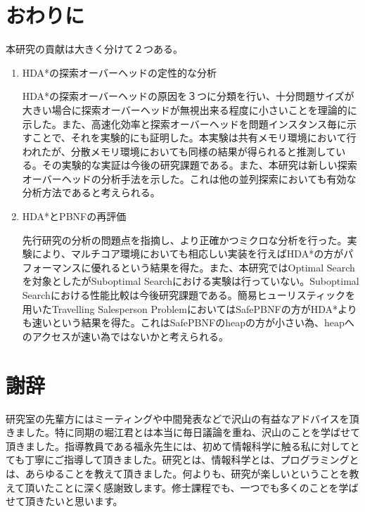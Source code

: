 \documentclass[uplatex]{jsarticle}
\begin{document}
\section{おわりに}
\label{sec:conclusion}

本研究の貢献は大きく分けて２つある。

\begin{enumerate}
\item HDA*の探索オーバーヘッドの定性的な分析

HDA*の探索オーバーヘッドの原因を３つに分類を行い、十分問題サイズが大きい場合に探索オーバーヘッドが無視出来る程度に小さいことを理論的に示した。また、高速化効率と探索オーバーヘッドを問題インスタンス毎に示すことで、それを実験的にも証明した。本実験は共有メモリ環境において行われたが、分散メモリ環境においても同様の結果が得られると推測している。その実験的な実証は今後の研究課題である。また、本研究は新しい探索オーバーヘッドの分析手法を示した。これは他の並列探索においても有効な分析方法であると考えられる。
\newline

\item HDA*とPBNFの再評価

先行研究の分析の問題点を指摘し、より正確かつミクロな分析を行った。実験により、マルチコア環境においても相応しい実装を行えばHDA*の方がパフォーマンスに優れるという結果を得た。また、本研究ではOptimal Searchを対象としたがSuboptimal Searchにおける実験は行っていない。Suboptimal Searchにおける性能比較は今後研究課題である。簡易ヒューリスティックを用いたTravelling Salesperson ProblemにおいてはSafePBNFの方がHDA*よりも速いという結果を得た。これはSafePBNFのheapの方が小さい為、heapへのアクセスが速い為ではないかと考えられる。


\end{enumerate}

\newpage
\section{謝辞}

研究室の先輩方にはミーティングや中間発表などで沢山の有益なアドバイスを頂きました。特に同期の堀江君とは本当に毎日議論を重ね、沢山のことを学ばせて頂きました。指導教員である福永先生には、初めて情報科学に触る私に対してとても丁寧にご指導して頂きました。研究とは、情報科学とは、プログラミングとは、あらゆることを教えて頂きました。何よりも、研究が楽しいということを教えて頂いたことに深く感謝致します。修士課程でも、一つでも多くのことを学ばせて頂きたいと思います。

\newpage




\newpage

\printindex
\end{document}
